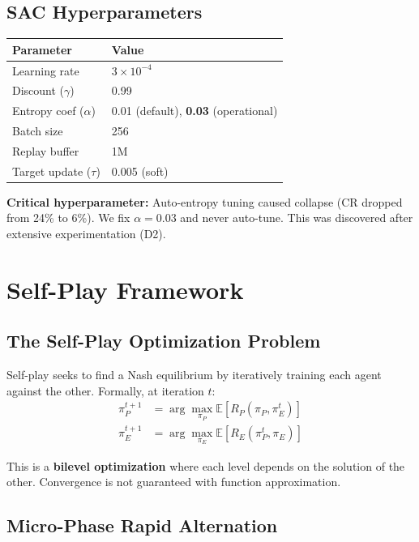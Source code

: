 \documentclass[11pt,a4paper]{report}
\begin{document}
\subsection{SAC Hyperparameters}
\begin{table}[h]
\centering
\begin{tabular}{@{}ll@{}}
\toprule
\textbf{Parameter} & \textbf{Value} \\
\midrule
Learning rate & $3 \times 10^{-4}$ \\
Discount ($\gamma$) & 0.99 \\
Entropy coef ($\alpha$) & 0.01 (default), \textbf{0.03} (operational) \\
Batch size & 256 \\
Replay buffer & 1M \\
Target update ($\tau$) & 0.005 (soft) \\
\bottomrule
\end{tabular}
\end{table}

\begin{warningbox}
\textbf{Critical hyperparameter:} Auto-entropy tuning caused collapse (CR dropped from 24\% to 6\%). We fix $\alpha = 0.03$ and never auto-tune. This was discovered after extensive experimentation (D2).
\end{warningbox}

\section{Self-Play Framework}

\subsection{The Self-Play Optimization Problem}

Self-play seeks to find a Nash equilibrium by iteratively training each agent against the other. Formally, at iteration $t$:
\begin{align}
    \pi_P^{t+1} &= \arg\max_{\pi_P} \mathbb{E}[R_P(\pi_P, \pi_E^t)] \\
    \pi_E^{t+1} &= \arg\max_{\pi_E} \mathbb{E}[R_E(\pi_P^t, \pi_E)]
\end{align}

This is a \textbf{bilevel optimization} where each level depends on the solution of the other. Convergence is not guaranteed with function approximation.

\subsection{Micro-Phase Rapid Alternation}
\end{document}
